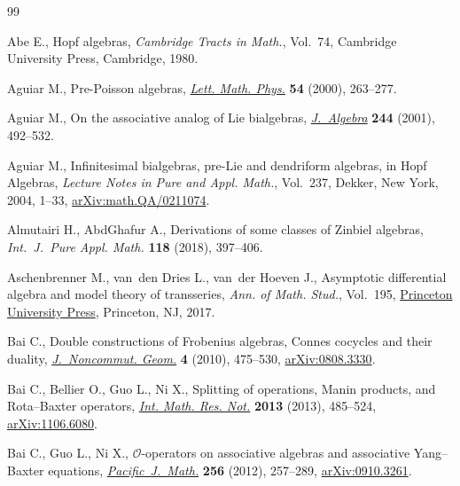 \begin{thebibliography}{99}
\footnotesize\itemsep=0pt

Abe E., Hopf algebras, \textit{Cambridge Tracts in Math.}, Vol.~74, Cambridge
 University Press, Cambridge, 1980.

Aguiar M., Pre-{P}oisson algebras, \href{https://doi.org/10.1023/A:1010818119040}{\textit{Lett. Math. Phys.}} \textbf{54}
 (2000), 263--277.

Aguiar M., On the associative analog of {L}ie bialgebras, \href{https://doi.org/10.1006/jabr.2001.8877}{\textit{J.~Algebra}}
 \textbf{244} (2001), 492--532.

Aguiar M., Infinitesimal bialgebras, pre-{L}ie and dendriform algebras, in Hopf
 Algebras, \textit{Lecture Notes in Pure and Appl. Math.}, Vol.~237, Dekker,
 New York, 2004, 1--33, \href{https://arxiv.org/abs/math.QA/0211074}{arXiv:math.QA/0211074}.

Almutairi H., AbdGhafur A., Derivations of some classes of {Z}inbiel algebras,
 \textit{Int.~J.~Pure Appl. Math.} \textbf{118} (2018), 397--406.

Aschenbrenner M., van~den Dries L., van~der Hoeven J., Asymptotic differential
 algebra and model theory of transseries, \textit{Ann. of Math. Stud.}, Vol.~195, \href{https://doi.org/10.1515/9781400885411}{Princeton University Press}, Princeton, NJ, 2017.

Bai C., Double constructions of {F}robenius algebras, {C}onnes cocycles and
 their duality, \href{https://doi.org/10.4171/JNCG/64}{\textit{J.~Noncommut. Geom.}} \textbf{4} (2010), 475--530,
 \href{https://arxiv.org/abs/0808.3330}{arXiv:0808.3330}.

Bai C., Bellier O., Guo L., Ni X., Splitting of operations, {M}anin products,
 and {R}ota--{B}axter operators, \href{https://doi.org/10.1093/imrn/rnr266}{\textit{Int. Math. Res. Not.}} \textbf{2013}
 (2013), 485--524, \href{https://arxiv.org/abs/1106.6080}{arXiv:1106.6080}.

Bai C., Guo L., Ni X., {$\mathcal{O}$}-operators on associative algebras and
 associative {Y}ang--{B}axter equations, \href{https://doi.org/10.2140/pjm.2012.256.257}{\textit{Pacific~J.~Math.}}
 \textbf{256} (2012), 257--289, \href{https://arxiv.org/abs/0910.3261}{arXiv:0910.3261}.


\end{thebibliography}
